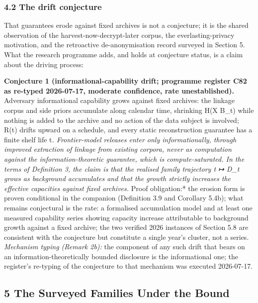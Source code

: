 \documentclass[
]{llncs}
\begin{document}
\subsubsection{4.2 The drift conjecture}\label{the-drift-conjecture}

That guarantees erode against fixed archives is not a conjecture; it is
the shared observation of the harvest-now-decrypt-later corpus, the
everlasting-privacy motivation, and the retroactive de-anonymisation
record surveyed in Section 5. What the research programme adds, and
holds at conjecture status, is a claim about the driving process:

\textbf{Conjecture 1 (informational-capability drift; programme register
C82 as re-typed 2026-07-17, moderate confidence, rate unestablished).}
Adversary informational capability grows against fixed archives: the
linkage corpus and side priors accumulate along calendar time, shrinking
H(X \textbar{} B\_t) while nothing is added to the archive and no action
of the data subject is involved; R(t) drifts upward on a schedule, and
every static reconstruction guarantee has a finite shelf life t\emph{.
Frontier-model releases enter only informationally, through improved
extraction of linkage from existing corpora, never as computation
against the information-theoretic guarantee, which is compute-saturated.
In the terms of Definition 3, the claim is that the realised family
trajectory t ↦ D\_t grows as background accumulates and that the growth
strictly increases the effective capacities against fixed archives.
}Proof obligation:* the erosion form is proven conditional in the
companion (Definition 3.9 and Corollary 5.4b); what remains conjectural
is the rate: a formalised accumulation model and at least one measured
capability series showing capacity increase attributable to background
growth against a fixed archive; the two verified 2026 instances of
Section 5.8 are consistent with the conjecture but constitute a single
year's cluster, not a series. \emph{Mechanism typing (Remark 2b):} the
component of any such drift that bears on an information-theoretically
bounded disclosure is the informational one; the register's re-typing of
the conjecture to that mechanism was executed 2026-07-17.

\subsection{5 The Surveyed Families Under the
Bound}\label{the-surveyed-families-under-the-bound}
\end{document}

